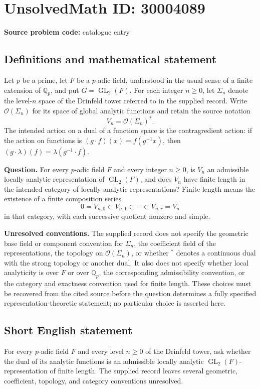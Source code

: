 \documentclass[11pt]{article}
\newcommand{\Q}{\mathbb{Q}}
\begin{document}
\section*{UnsolvedMath ID: 30004089}
\textbf{Source problem code:} catalogue entry
\subsection{Definitions and mathematical statement}
Let \(p\) be a prime, let \(F\) be a \(p\)-adic field, understood in the usual sense of a finite extension of \(\Q_p\), and put \(G=\operatorname{GL}_2(F)\). For each integer \(n\geq 0\), let \(\Sigma_n\) denote the level-\(n\) space of the Drinfeld tower referred to in the supplied record. Write \(\mathcal O(\Sigma_n)\) for its space of global analytic functions and retain the source notation
\[
V_n=\mathcal O(\Sigma_n)^*.
\]
The intended action on a dual of a function space is the contragredient action: if the action on functions is \((g\cdot f)(x)=f(g^{-1}x)\), then \((g\cdot\lambda)(f)=\lambda(g^{-1}\cdot f)\).

\textbf{Question.} For every \(p\)-adic field \(F\) and every integer \(n\geq 0\), is \(V_n\) an admissible locally analytic representation of \(\operatorname{GL}_2(F)\), and does \(V_n\) have finite length in the intended category of locally analytic representations? Finite length means the existence of a finite composition series
\[
0=V_{n,0}\subset V_{n,1}\subset\cdots\subset V_{n,r}=V_n
\]
in that category, with each successive quotient nonzero and simple.

\textbf{Unresolved conventions.} The supplied record does not specify the geometric base field or component convention for \(\Sigma_n\), the coefficient field of the representations, the topology on \(\mathcal O(\Sigma_n)\), or whether \({}^*\) denotes a continuous dual with the strong topology or another dual. It also does not specify whether local analyticity is over \(F\) or over \(\Q_p\), the corresponding admissibility convention, or the category and exactness convention used for finite length. These choices must be recovered from the cited source before the question determines a fully specified representation-theoretic statement; no particular choice is asserted here.
\subsection{Short English statement}
For every \(p\)-adic field \(F\) and every level \(n\geq 0\) of the Drinfeld tower, ask whether the dual of its analytic functions is an admissible locally analytic \(\operatorname{GL}_2(F)\)-representation of finite length. The supplied record leaves several geometric, coefficient, topology, and category conventions unresolved.
\end{document}

